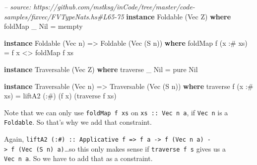 \documentclass[]{article}
\newenvironment{Shaded}{\begin{snugshade}}{\end{snugshade}}
\newcommand{\CommentTok}[1]{\textcolor[rgb]{0.56,0.35,0.01}{\textit{#1}}}
\newcommand{\DataTypeTok}[1]{\textcolor[rgb]{0.13,0.29,0.53}{#1}}
\newcommand{\FunctionTok}[1]{\textcolor[rgb]{0.00,0.00,0.00}{#1}}
\newcommand{\KeywordTok}[1]{\textcolor[rgb]{0.13,0.29,0.53}{\textbf{#1}}}
\newcommand{\NormalTok}[1]{#1}
\newcommand{\OtherTok}[1]{\textcolor[rgb]{0.56,0.35,0.01}{#1}}
\begin{document}
\begin{Shaded}
\begin{Highlighting}[]
\CommentTok{-- source: https://github.com/mstksg/inCode/tree/master/code-samples/fixvec/FVTypeNats.hs#L65-75}
\KeywordTok{instance} \DataTypeTok{Foldable}\NormalTok{ (}\DataTypeTok{Vec} \DataTypeTok{Z}\NormalTok{) }\KeywordTok{where}
\NormalTok{    foldMap _ }\DataTypeTok{Nil} \FunctionTok{=}\NormalTok{ mempty}

\KeywordTok{instance} \DataTypeTok{Foldable}\NormalTok{ (}\DataTypeTok{Vec}\NormalTok{ n) }\OtherTok{=>} \DataTypeTok{Foldable}\NormalTok{ (}\DataTypeTok{Vec}\NormalTok{ (}\DataTypeTok{S}\NormalTok{ n)) }\KeywordTok{where}
\NormalTok{    foldMap f (x }\FunctionTok{:#}\NormalTok{ xs) }\FunctionTok{=}\NormalTok{ f x }\FunctionTok{<>}\NormalTok{ foldMap f xs}

\KeywordTok{instance} \DataTypeTok{Traversable}\NormalTok{ (}\DataTypeTok{Vec} \DataTypeTok{Z}\NormalTok{) }\KeywordTok{where}
\NormalTok{    traverse _ }\DataTypeTok{Nil} \FunctionTok{=}\NormalTok{ pure }\DataTypeTok{Nil}

\KeywordTok{instance} \DataTypeTok{Traversable}\NormalTok{ (}\DataTypeTok{Vec}\NormalTok{ n) }\OtherTok{=>} \DataTypeTok{Traversable}\NormalTok{ (}\DataTypeTok{Vec}\NormalTok{ (}\DataTypeTok{S}\NormalTok{ n)) }\KeywordTok{where}
\NormalTok{    traverse f (x }\FunctionTok{:#}\NormalTok{ xs) }\FunctionTok{=}\NormalTok{ liftA2 (}\FunctionTok{:#}\NormalTok{) (f x) (traverse f xs)}
\end{Highlighting}
\end{Shaded}

Note that we can only use \texttt{foldMap\ f\ xs} on \texttt{xs\ ::\ Vec\ n\ a},
if \texttt{Vec\ n} is a \texttt{Foldable}. So that's why we add that constraint.

Again,
\texttt{liftA2\ (:\#)\ ::\ Applicative\ f\ =\textgreater{}\ f\ a\ -\textgreater{}\ f\ (Vec\ n\ a)\ -\textgreater{}\ f\ (Vec\ (S\ n)\ a)}\ldots{}so
this only makes sense if \texttt{traverse\ f\ s} gives us a \texttt{Vec\ n\ a}.
So we have to add that as a constraint.
\end{document}
